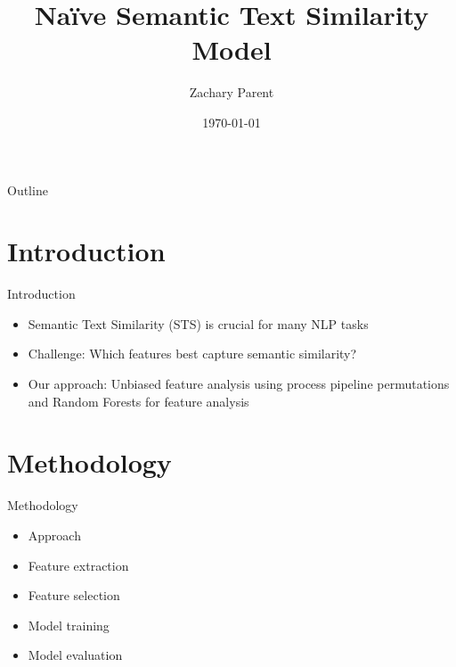 \documentclass{beamer}
\title{Naïve Semantic Text Similarity Model}
\author{Zachary Parent}
\institute{UPC}
\date{\today}
\begin{document}
\begin{frame}
    \titlepage
\end{frame}

\begin{frame}{Outline}
    \tableofcontents
\end{frame}

\section{Introduction}
\begin{frame}{Introduction}
    \begin{itemize}
        \item Semantic Text Similarity (STS) is crucial for many NLP tasks
        \item Challenge: Which features best capture semantic similarity? \cite{10.5555/2387636.2387697}
        \item Our approach: Unbiased feature analysis using process pipeline permutations and Random Forests for feature analysis
    \end{itemize}
\end{frame}

\section{Methodology}
\begin{frame}{Methodology}
    \begin{itemize}
        \item Approach
        \item Feature extraction
        \item Feature selection
        \item Model training
        \item Model evaluation
    \end{itemize}
\end{frame}
\end{document}
